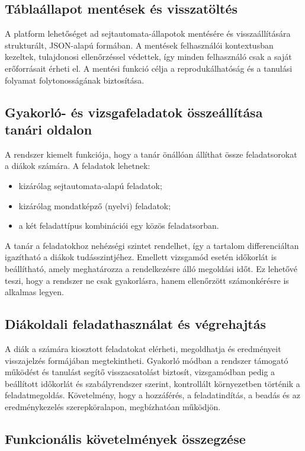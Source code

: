 \documentclass{thesis-ekf}
\begin{document}
\subsection{Táblaállapot mentések és visszatöltés}

A platform lehetőséget ad sejtautomata-állapotok mentésére és visszaállítására strukturált, JSON-alapú formában. A mentések felhasználói kontextusban kezeltek, tulajdonosi ellenőrzéssel védettek, így minden felhasználó csak a saját erőforrásait érheti el. A mentési funkció célja a reprodukálhatóság és a tanulási folyamat folytonosságának biztosítása.

\subsection{Gyakorló- és vizsgafeladatok összeállítása tanári oldalon}

A rendszer kiemelt funkciója, hogy a tanár önállóan állíthat össze feladatsorokat a diákok számára. A feladatok lehetnek:
\begin{itemize}
  \item kizárólag sejtautomata-alapú feladatok;
  \item kizárólag mondatképző (nyelvi) feladatok;
  \item a két feladattípus kombinációi egy közös feladatsorban.
\end{itemize}

A tanár a feladatokhoz nehézségi szintet rendelhet, így a tartalom differenciáltan igazítható a diákok tudásszintjéhez. Emellett vizsgamód esetén időkorlát is beállítható, amely meghatározza a rendelkezésre álló megoldási időt. Ez lehetővé teszi, hogy a rendszer ne csak gyakorlásra, hanem ellenőrzött számonkérésre is alkalmas legyen.

\subsection{Diákoldali feladathasználat és végrehajtás}

A diák a számára kiosztott feladatokat elérheti, megoldhatja és eredményeit visszajelzés formájában megtekintheti. Gyakorló módban a rendszer támogató működést és tanulást segítő visszacsatolást biztosít, vizsgamódban pedig a beállított időkorlát és szabályrendszer szerint, kontrollált környezetben történik a feladatmegoldás. Követelmény, hogy a hozzáférés, a feladatindítás, a beadás és az eredménykezelés szerepköralapon, megbízhatóan működjön.

\subsection{Funkcionális követelmények összegzése}
\end{document}

